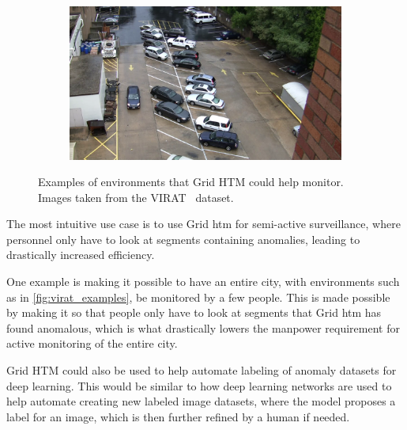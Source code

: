 \begin{figure}[H]
\begin{subfigure}{0.49\linewidth}
    \end{subfigure}
    \begin{subfigure}{0.49\linewidth}
        \includegraphics[width=\linewidth]{resources/methodology/surveillance_example4.png}
    \end{subfigure}
    \caption[Grid HTM Environments]{Examples of environments that Grid HTM could help monitor. Images taken from the VIRAT~\cite{VIRAT} dataset.}
    \label{fig:virat_examples}
\end{figure}
The most intuitive use case is to use Grid \gls*{htm} for semi-active surveillance, where personnel only have to look at segments containing anomalies, leading to drastically increased efficiency.
\par
One example is making it possible to have an entire city, with environments such as in \autoref{fig:virat_examples}, be monitored by a few people. This is made possible by making it so that people only have to look at segments that Grid \gls*{htm} has found anomalous, which is what drastically lowers the manpower requirement for active monitoring of the entire city.
\par
Grid HTM could also be used to help automate labeling of anomaly datasets for deep learning. This would be similar to how deep learning networks are used to help automate creating new labeled image datasets, where the model proposes a label for an image, which is then further refined by a human if needed.
